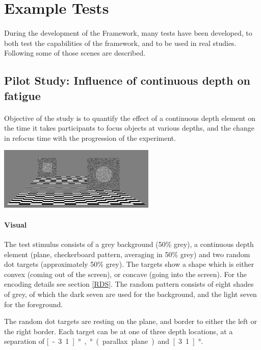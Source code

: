 \section{Example Tests}
\paragraph{}
During the development of the Framework, many tests have been developed, to both test the capabilities of the framework, and to be used in real studies. Following some of those scenes are described.


\subsection[Influence of continuous depth]{Pilot Study: Influence of continuous depth on fatigue}
\paragraph{}
Objective of the study is to quantify the effect of a continuous depth element on the time it takes participants to focus objects at various depths, and the change in refocus time with the progression of the experiment.

\begin{center}
\includegraphics[width=7.5cm]{media/pilotFatigue.png}
\end{center}

\paragraph{Visual}
The test stimulus consists of a grey background (50\% grey), a continuous depth element (plane, checkerboard pattern, averaging in 50\% grey) and two random dot targets (approximately 50\% grey).
The targets show a shape which is either convex (coming out of the screen), or concave (going into the screen).
For the encoding details see section \ref{RDS}. The random pattern consists of eight shades of grey, of which the dark seven are used for the background, and the light seven for the foreground.

The random dot targets are resting on the plane, and border to either the left or the right border.
Each target can be at  one of three depth locations, at a separation of \unit[-3.1]{°}, \unit[0]{°} (parallax plane) and \unit[3.1]{°}.


